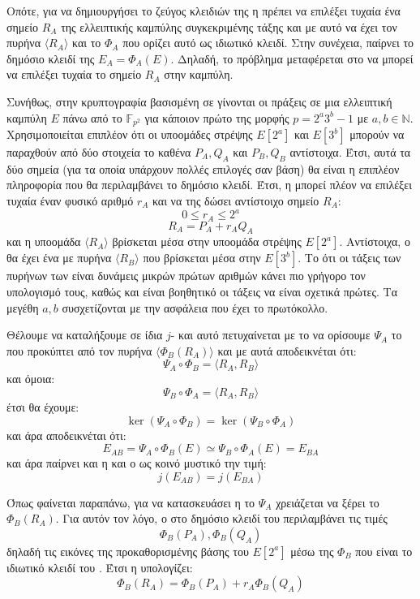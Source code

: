 \documentclass[oneside,a4paper]{article}
\begin{document}
Οπότε, για να δημιουργήσει το ζεύγος κλειδιών της η  πρέπει να επιλέξει τυχαία ένα σημείο $R_A$ της ελλειπτικής καμπύλης συγκεκριμένης τάξης και με αυτό να έχει τον πυρήνα $\langle R_A \rangle$ και το  $\Phi_A$ που ορίζει αυτό ως ιδιωτικό κλειδί. Στην συνέχεια, παίρνει το δημόσιο κλειδί της $E_A = \Phi_A(E)$. Δηλαδή, το πρόβλημα μεταφέρεται στο να μπορεί να επιλέξει τυχαία το σημείο $R_A$ στην καμπύλη.

Συνήθως, στην κρυπτογραφία βασισμένη σε  γίνονται οι πράξεις σε μια ελλειπτική καμπύλη $E$ πάνω από το $\mathbb{F}_{p^2}$ για κάποιον πρώτο της μορφής $p=2^a 3^b -1$ με $a,b \in \mathbb{N}$. Χρησιμοποιείται επιπλέον ότι οι υποομάδες στρέψης $E[2^a]$ και $E[3^b]$ μπορούν να παραχθούν από δύο στοιχεία το καθένα $P_A,Q_A$ και $P_B,Q_B$ αντίστοιχα. Έτσι, αυτά τα δύο σημεία (για τα οποία υπάρχουν πολλές επιλογές σαν βάση) θα είναι η επιπλέον πληροφορία που θα περιλαμβάνει το δημόσιο κλειδί. Έτσι, η  μπορεί πλέον να επιλέξει τυχαία έναν φυσικό αριθμό $r_A$ και να της δώσει αντίστοιχο σημείο $R_A$:
$$0\leq r_A \leq 2^a$$
$$R_A = P_A + r_A Q_A$$
και η υποομάδα $\langle R_A \rangle$ βρίσκεται μέσα στην υποομάδα στρέψης $E[2^a]$. Αντίστοιχα, ο  θα έχει ένα  με πυρήνα $\langle R_B \rangle$ που βρίσκεται μέσα στην $E[3^b]$. Το ότι οι τάξεις των πυρήνων των  είναι δυνάμεις μικρών πρώτων αριθμών κάνει πιο γρήγορο τον υπολογισμό τους, καθώς και είναι βοηθητικό οι τάξεις να είναι σχετικά πρώτες. Τα μεγέθη $a,b$ συσχετίζονται με την ασφάλεια που έχει το πρωτόκολλο.



Θέλουμε να καταλήξουμε σε ίδια $j$- και αυτό πετυχαίνεται με το να ορίσουμε $\Psi_A$ το  που προκύπτει από τον πυρήνα $\langle \Phi_B(R_A) \rangle$ και με αυτά αποδεικνέται ότι:
$$\Psi_A \circ \Phi_B = \langle R_A, R_B \rangle$$ και όμοια:
$$\Psi_B \circ \Phi_A = \langle R_A, R_B \rangle$$ έτσι θα έχουμε:
$$\ker (\Psi_A \circ \Phi_B) = \ker (\Psi_B \circ \Phi_A)$$ και άρα αποδεικνέται ότι:
$$E_{AB} = \Psi_A \circ \Phi_B(E) \simeq \Psi_B \circ \Phi_A (E) = E_{BA}$$ και άρα παίρνει και η  και ο  ως κοινό μυστικό την τιμή:
$$j(E_{AB}) = j(E_{BA})$$

Όπως φαίνεται παραπάνω, για να κατασκευάσει η  το $\Psi_A$ χρειάζεται να ξέρει το $\Phi_B(R_A)$. Για αυτόν τον λόγο, ο  στο δημόσιο κλειδί του περιλαμβάνει τις τιμές $$\Phi_B(P_A), \Phi_B(Q_A)$$ δηλαδή τις εικόνες της προκαθορισμένης βάσης του $E[2^a]$ μέσω της $\Phi_B$ που είναι το ιδιωτικό κλειδί του . Έτσι η  υπολογίζει:
$$\Phi_B(R_A) =  \Phi_B(P_A) + r_A \Phi_B(Q_A)$$
\end{document}

